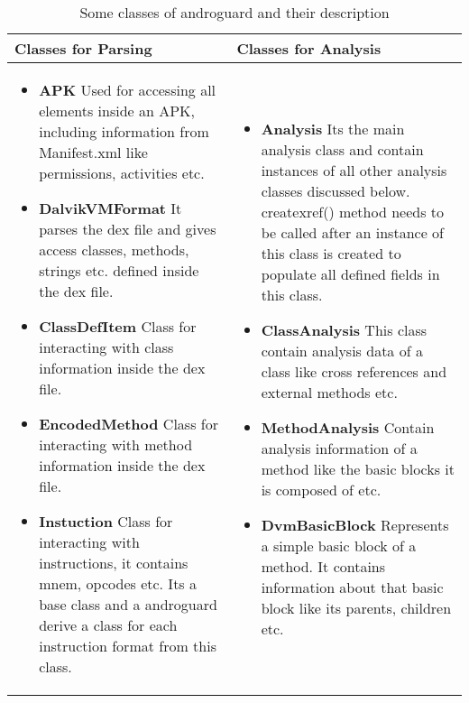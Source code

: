 \documentclass[../main.tex]{subfile}
\begin{document}
		\begin{table} 
			\begin{center}
				\begin{tabular}{|p{5cm}|p{5cm}|}
					\hline \textbf{Classes for Parsing} & \textbf{Classes for Analysis}\\ \hline
					\begin{itemize}
						\item \textbf{APK} Used for accessing all elements inside an APK, including information from Manifest.xml like permissions, activities etc.
						\item \textbf{DalvikVMFormat}	It parses the dex file and gives access classes, methods, strings etc. defined inside the dex file.
						\item \textbf{ClassDefItem} Class for interacting with class information inside the dex file.
						\item \textbf{EncodedMethod} Class for interacting with method information inside the dex file. 
						\item \textbf{Instuction} Class for interacting with instructions, it contains mnem, opcodes etc. Its a base class and a androguard derive a class for each instruction format from this class.
					\end{itemize}
					
					&
					
					\begin{itemize}
						\item \textbf{Analysis} Its the main analysis class and contain instances of all other analysis classes discussed below. create\textunderscore xref() method needs to be called after an instance of this class is created to populate all defined fields in this class.
						\item \textbf{ClassAnalysis} This class contain analysis data of a class like cross references and external methods etc.
						\item \textbf{MethodAnalysis} Contain analysis information of a method like the basic blocks it is composed of etc.
						\item \textbf{DvmBasicBlock} Represents a simple basic block of a method. It contains information about that basic block like its parents, children etc.
						\end{itemize}\\ \hline
					
				\end{tabular}
			\end{center}
			\caption{Some classes of androguard and their description}
			\label{table:androguard_classes}
		\end{table}
		
\end{document}
